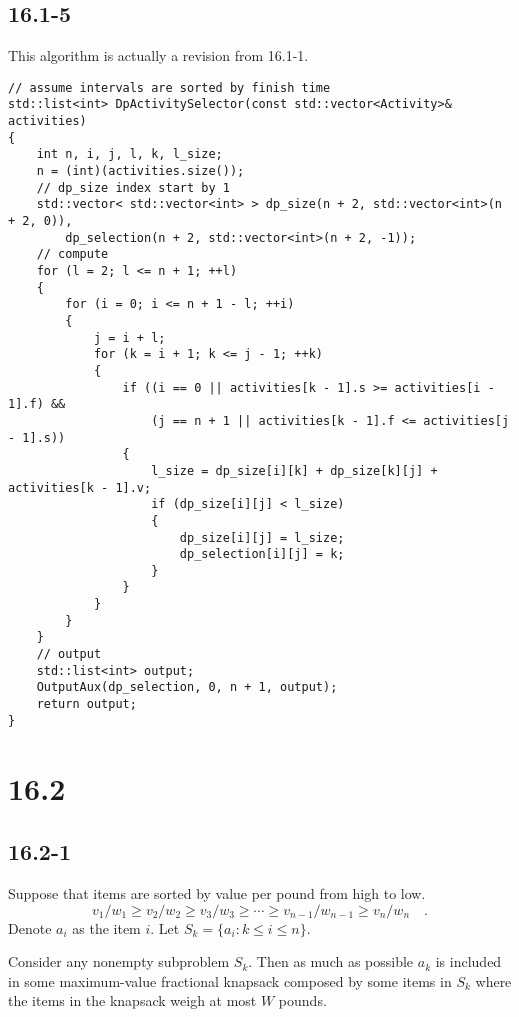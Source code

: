 \subsection*{16.1-5}

This algorithm is actually a revision from 16.1-1.

\begin{verbatim}
// assume intervals are sorted by finish time
std::list<int> DpActivitySelector(const std::vector<Activity>& activities)
{
    int n, i, j, l, k, l_size;
    n = (int)(activities.size());
    // dp_size index start by 1
    std::vector< std::vector<int> > dp_size(n + 2, std::vector<int>(n + 2, 0)), 
        dp_selection(n + 2, std::vector<int>(n + 2, -1));
    // compute
    for (l = 2; l <= n + 1; ++l)
    {
        for (i = 0; i <= n + 1 - l; ++i)
        {
            j = i + l;
            for (k = i + 1; k <= j - 1; ++k)
            {
                if ((i == 0 || activities[k - 1].s >= activities[i - 1].f) && 
                    (j == n + 1 || activities[k - 1].f <= activities[j - 1].s))
                {
                    l_size = dp_size[i][k] + dp_size[k][j] + activities[k - 1].v;
                    if (dp_size[i][j] < l_size)
                    {
                        dp_size[i][j] = l_size;
                        dp_selection[i][j] = k;
                    }
                }
            }
        }
    }
    // output
    std::list<int> output;
    OutputAux(dp_selection, 0, n + 1, output);
    return output;
}
\end{verbatim}

\section*{16.2}

\subsection*{16.2-1}

Suppose that items are sorted by value per pound from high to low.
\begin{equation*}
    v_1 / w_1 \geq v_2 / w_2 \geq v_3 / w_3 \geq \cdots 
    \geq v_{n-1} / w_{n-1} \geq v_n / w_n
    \quad .
\end{equation*}
Denote $a_i$ as the item $i$.
Let $S_k = \{ a_i : k \leq i \leq n \}$.

\begin{claim}
    Consider any nonempty subproblem $S_k$.
    Then as much as possible $a_k$ is included in some maximum-value fractional knapsack
    composed by some items in $S_k$
    where the items in the knapsack weigh at most $W$ pounds.
\end{claim}


